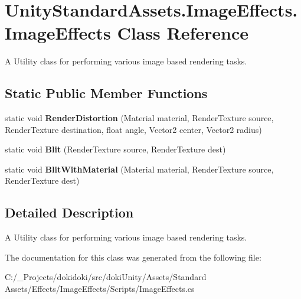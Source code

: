 \hypertarget{class_unity_standard_assets_1_1_image_effects_1_1_image_effects}{}\section{Unity\+Standard\+Assets.\+Image\+Effects.\+Image\+Effects Class Reference}
\label{class_unity_standard_assets_1_1_image_effects_1_1_image_effects}


A Utility class for performing various image based rendering tasks.  


\subsection*{Static Public Member Functions}
\begin{DoxyCompactItemize}
\item 
static void {\bfseries Render\+Distortion} (Material material, Render\+Texture source, Render\+Texture destination, float angle, Vector2 center, Vector2 radius)\hypertarget{class_unity_standard_assets_1_1_image_effects_1_1_image_effects_ad4557264b78d34379449952065aab703}{}\label{class_unity_standard_assets_1_1_image_effects_1_1_image_effects_ad4557264b78d34379449952065aab703}

\item 
static void {\bfseries Blit} (Render\+Texture source, Render\+Texture dest)\hypertarget{class_unity_standard_assets_1_1_image_effects_1_1_image_effects_a82a64f2e82d876bead66b76ac372f916}{}\label{class_unity_standard_assets_1_1_image_effects_1_1_image_effects_a82a64f2e82d876bead66b76ac372f916}

\item 
static void {\bfseries Blit\+With\+Material} (Material material, Render\+Texture source, Render\+Texture dest)\hypertarget{class_unity_standard_assets_1_1_image_effects_1_1_image_effects_ab20941a3216980c86da8a596ce4ebcf6}{}\label{class_unity_standard_assets_1_1_image_effects_1_1_image_effects_ab20941a3216980c86da8a596ce4ebcf6}

\end{DoxyCompactItemize}


\subsection{Detailed Description}
A Utility class for performing various image based rendering tasks. 

The documentation for this class was generated from the following file\+:\begin{DoxyCompactItemize}
\item 
C\+:/\+\_\+\+Projects/dokidoki/src/doki\+Unity/\+Assets/\+Standard Assets/\+Effects/\+Image\+Effects/\+Scripts/Image\+Effects.\+cs\end{DoxyCompactItemize}

